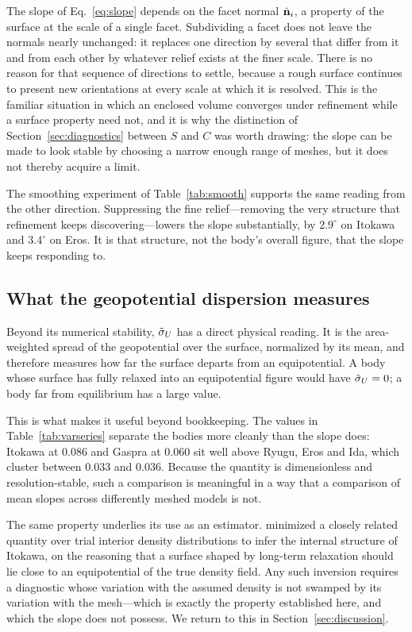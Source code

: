 The slope of Eq.~\eqref{eq:slope} depends on the facet normal $\hat{\mathbf{n}}_{i}$, a
property of the surface at the scale of a single facet. Subdividing a facet
does not leave the normals nearly unchanged: it replaces one direction by
several that differ from it and from each other by whatever relief exists at the
finer scale. There is no reason for that sequence of directions to settle,
because a rough surface continues to present new orientations at every scale at
which it is resolved. This is the familiar situation in which an enclosed volume
converges under refinement while a surface property need not, and it is why the
distinction of Section~\ref{sec:diagnostics} between $S$ and $C$ was worth
drawing: the slope can be made to look stable by choosing a narrow enough range
of meshes, but it does not thereby acquire a limit.

The smoothing experiment of Table~\ref{tab:smooth} supports the same reading
from the other direction. Suppressing the fine relief---removing the very
structure that refinement keeps discovering---lowers the slope substantially,
by $2.9^{\circ}$ on Itokawa and $3.4^{\circ}$ on Eros. It is that structure,
not the body's overall figure, that the slope keeps responding to.

\subsection{What the geopotential dispersion measures}
\label{sec:varmeaning}

Beyond its numerical stability, $\tilde{\sigma}_{U}$ has a direct physical reading. It is
the area-weighted spread of the geopotential over the surface, normalized by
its mean, and therefore measures how far the surface departs from an
equipotential. A body whose surface has fully relaxed into an equipotential
figure would have $\tilde{\sigma}_{U} = 0$; a body far from equilibrium has a large value.

This is what makes it useful beyond bookkeeping. The values in
Table~\ref{tab:varseries} separate the bodies more cleanly than the slope does:
Itokawa at $0.086$ and Gaspra at $0.060$ sit well above Ryugu, Eros and Ida,
which cluster between $0.033$ and $0.036$. Because the quantity is
dimensionless and resolution-stable, such a comparison is meaningful in a way
that a comparison of mean slopes across differently meshed models is not.

The same property underlies its use as an estimator. \citet{kanamaru2019}
minimized a closely related quantity over trial interior density distributions
to infer the internal structure of Itokawa, on the reasoning that a surface
shaped by long-term relaxation should lie close to an equipotential of the true
density field. Any such inversion requires a diagnostic whose variation with
the assumed density is not swamped by its variation with the mesh---which is
exactly the property established here, and which the slope does not possess.
We return to this in Section~\ref{sec:discussion}.

